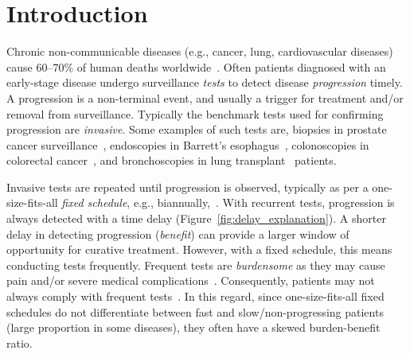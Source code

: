 \section{Introduction}
\label{sec:introduction}
Chronic non-communicable diseases (e.g., cancer, lung, cardiovascular diseases) cause 60--70\% of human deaths worldwide~\citep{world2014global}. Often patients diagnosed with an early-stage disease undergo surveillance \emph{tests} to detect disease \emph{progression} timely. A progression is a non-terminal event, and usually a trigger for treatment and/or removal from surveillance. Typically the benchmark tests used for confirming progression are \emph{invasive}. Some examples of such tests are, biopsies in prostate cancer surveillance~\citep{bokhorst2015compliance}, endoscopies in Barrett's esophagus~\citep{weusten2017endoscopic}, colonoscopies in colorectal cancer~\citep{krist2007timing}, and bronchoscopies in lung transplant~\citep{mcwilliams2008surveillance} patients.

Invasive tests are repeated until progression is observed, typically as per a one-size-fits-all \emph{fixed schedule}, e.g., biannually,~\citep{mcwilliams2008surveillance,bokhorst2015compliance,krist2007timing}. With recurrent tests, progression is always detected with a time delay (Figure~\ref{fig:delay_explanation}). A shorter delay in detecting progression (\emph{benefit}) can provide a larger window of opportunity for curative treatment. However, with a fixed schedule, this means conducting tests frequently. Frequent tests are \textit{burdensome} as they may cause pain and/or severe medical complications~\citep{loeb2013systematic,krist2007timing}. Consequently, patients may not always comply with frequent tests~\citep{bokhorst2015compliance, LeClercq2015325}. In this regard, since one-size-fits-all fixed schedules do not differentiate between fast and slow/non-progressing patients (large proportion in some diseases), they often have a skewed burden-benefit ratio.

